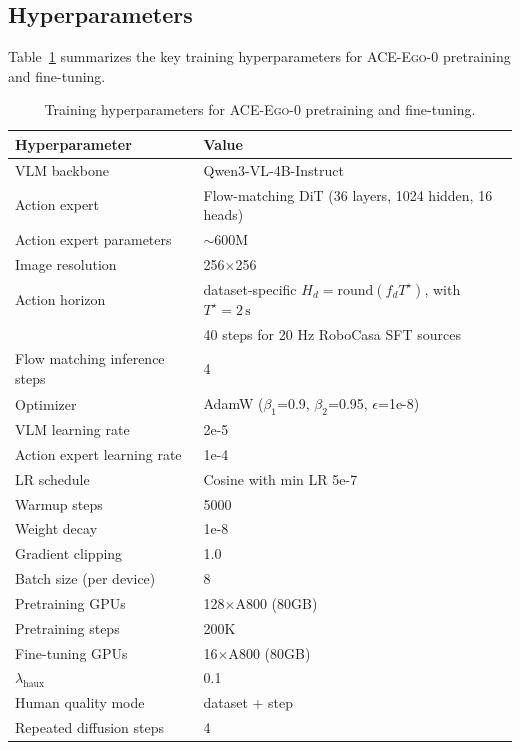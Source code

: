 \documentclass{llmxive}
\providecommand{\OURS}{\textsc{ACE-Ego-0}\xspace}
\providecommand{\Ours}{\OURS}
\begin{document}
\subsection{Hyperparameters}
\label{app:hyperparameters}

Table~\ref{tab:hyperparams} summarizes the key training hyperparameters for \Ours pretraining and fine-tuning.

\begin{table}[htbp]
\centering
\small
\begin{tabular}{ll}
\toprule
\textbf{Hyperparameter} & \textbf{Value} \\
\midrule
VLM backbone & Qwen3-VL-4B-Instruct \\
Action expert & Flow-matching DiT (36 layers, 1024 hidden, 16 heads) \\
Action expert parameters & $\sim$600M \\
Image resolution & 256$\times$256 \\
Action horizon & dataset-specific \(H_d = \mathrm{round}(f_d T^\star)\), with \(T^\star = 2\,\mathrm{s}\) \\ & 40 steps for 20 Hz RoboCasa SFT sources \\
Flow matching inference steps & 4 \\
Optimizer & AdamW ($\beta_1$=0.9, $\beta_2$=0.95, $\epsilon$=1e-8) \\
VLM learning rate & 2e-5 \\
Action expert learning rate & 1e-4 \\
LR schedule & Cosine with min LR 5e-7 \\
Warmup steps & 5000 \\
Weight decay & 1e-8 \\
Gradient clipping & 1.0 \\
Batch size (per device) & 8 \\
Pretraining GPUs & 128$\times$A800 (80GB) \\
Pretraining steps & 200K \\
Fine-tuning GPUs & 16$\times$A800 (80GB) \\
$\lambda_{\mathrm{haux}}$ & 0.1 \\
Human quality mode & dataset + step \\
Repeated diffusion steps & 4 \\
\bottomrule
\end{tabular}
\caption{Training hyperparameters for \Ours pretraining and fine-tuning.}
\label{tab:hyperparams}
\end{table}
\end{document}
